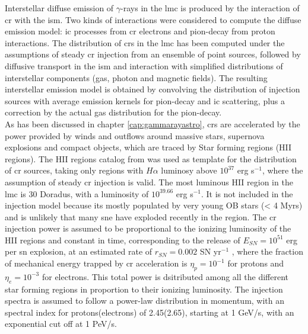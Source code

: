 \documentclass[main.tex]{subfiles}
\begin{document}
Interstellar diffuse emission of $\gamma$-rays in the \gls{lmc} is produced by the interaction of \gls{cr} with the \gls{ism}. Two kinds of interactions were considered to compute the diffuse emission model: \gls{ic} processes from \gls{cr} electrons and pion-decay from proton interactions. The distribution of \glspl{cr} in the \gls{lmc} has been computed under the assumptions of steady \gls{cr} injection from an ensemble of point sources, followed by diffusive transport in the \gls{ism} and interaction with simplified distributions of interstellar components (gas, photon and magnetic fields). The resulting interstellar emission model is obtained by convolving the distribution of injection sources with average emission kernels for pion-decay and \gls{ic} scattering, plus a correction by the actual gas distribution for the pion-decay.\\
As has been discussed in chapter \ref{cap:gammarayastro}, \glspl{cr} are accelerated by the power provided by winds and outflows around massive stars, supernova explosions and compact objects, which are traced by Star forming regions (HII regions). The HII regions catalog from \cite{2012HIIinLMC} was used as template for the distribution of \gls{cr} sources, taking only regions with $H\alpha$ luminosy above $10^{37}$ erg s$^{-1}$, where the assumption of steady \gls{cr} injection is valid. The most luminous HII region in the \gls{lmc} is 30 Doradus, with a luminosity of $10^{39.66}$ erg s$^{-1}$. It is not included in the injection model because its mostly populated by very young OB stars (< 4 Myrs) \cite{201130Doradusstarforming} and is unlikely that many \gls{sne} have exploded recently in the region. The \gls{cr} injection power is assumed to be proportional to the ionizing luminosity of the HII regions and constant in time, corresponding to the release of $E_{SN} = 10^{51}$ erg per \gls{sn} explosion, at an estimated rate of $r_{SN} =  0.002$ SN yr$^{-1}$ \cite{1991SNrates}, where the fraction of mechanical energy trapped by \gls{cr} acceleration is $\eta_{p} = 10^{-1}$ for protons and $\eta_{e} = 10^{-3}$ for electrons. This total power is dsitributed among all the different star forming regions in proportion to their ionizing luminosity.
The injection spectra is assumed to follow a power-law distribution in momentum, with an spectral index for protons(electrons) of 2.45(2.65), starting at 1 GeV/s, with an exponential cut off at 1 PeV/s.\\
\end{document}
